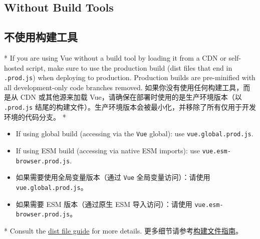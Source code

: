 \begin{paracol}{2}
\subsection{Without Build Tools}
\switchcolumn
\subsection{不使用构建工具}
\switchcolumn[0]*%
If you are using Vue without a build tool by loading it from a CDN or
self-hosted script, make sure to use the production build (dist files
that end in \texttt{.prod.js}) when deploying to production. Production
builds are pre-minified with all development-only code branches removed.
\switchcolumn
如果你没有使用任何构建工具，而是从 CDN 或其他源来加载
Vue，请确保在部署时使用的是生产环境版本（以 \texttt{.prod.js}
结尾的构建文件）。生产环境版本会被最小化，并移除了所有仅用于开发环境的代码分支。
\switchcolumn[0]*%
\begin{itemize}
\item
  If using global build (accessing via the \texttt{Vue} global): use
  \texttt{vue.global.prod.js}.
\item
  If using ESM build (accessing via native ESM imports): use
  \texttt{vue.esm-browser.prod.js}.
\end{itemize}
\switchcolumn
\begin{itemize}
\item
  如果需要使用全局变量版本（通过 \texttt{Vue} 全局变量访问）：请使用
  \texttt{vue.global.prod.js}。
\item
  如果需要 ESM 版本（通过原生 ESM 导入访问）：请使用
  \texttt{vue.esm-browser.prod.js}。
\end{itemize}
\switchcolumn[0]*%
Consult the
\href{https://github.com/vuejs/core/tree/main/packages/vue\#which-dist-file-to-use}{dist
file guide} for more details.
\switchcolumn
更多细节请参考\href{https://github.com/vuejs/core/tree/main/packages/vue\#which-dist-file-to-use}{构建文件指南}。
\end{paracol}



